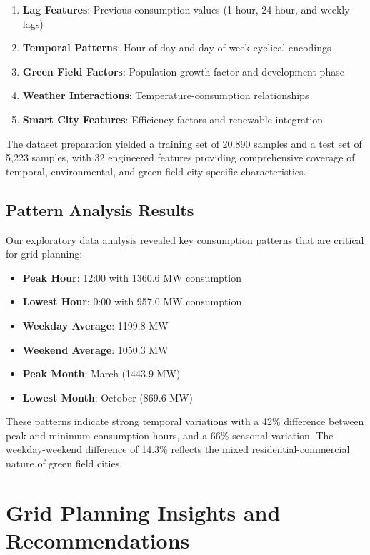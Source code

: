 \documentclass[12pt,a4paper]{article}
\begin{document}
\begin{enumerate}
    \item \textbf{Lag Features}: Previous consumption values (1-hour, 24-hour, and weekly lags)
    \item \textbf{Temporal Patterns}: Hour of day and day of week cyclical encodings
    \item \textbf{Green Field Factors}: Population growth factor and development phase
    \item \textbf{Weather Interactions}: Temperature-consumption relationships
    \item \textbf{Smart City Features}: Efficiency factors and renewable integration
\end{enumerate}

The dataset preparation yielded a training set of 20,890 samples and a test set of 5,223 samples, with 32 engineered features providing comprehensive coverage of temporal, environmental, and green field city-specific characteristics.

\subsection{Pattern Analysis Results}
Our exploratory data analysis revealed key consumption patterns that are critical for grid planning:

\begin{itemize}
    \item \textbf{Peak Hour}: 12:00 with 1360.6 MW consumption
    \item \textbf{Lowest Hour}: 0:00 with 957.0 MW consumption
    \item \textbf{Weekday Average}: 1199.8 MW
    \item \textbf{Weekend Average}: 1050.3 MW
    \item \textbf{Peak Month}: March (1443.9 MW)
    \item \textbf{Lowest Month}: October (869.6 MW)
\end{itemize}

These patterns indicate strong temporal variations with a 42\% difference between peak and minimum consumption hours, and a 66\% seasonal variation. The weekday-weekend difference of 14.3\% reflects the mixed residential-commercial nature of green field cities.

\section{Grid Planning Insights and Recommendations}
\end{document}
